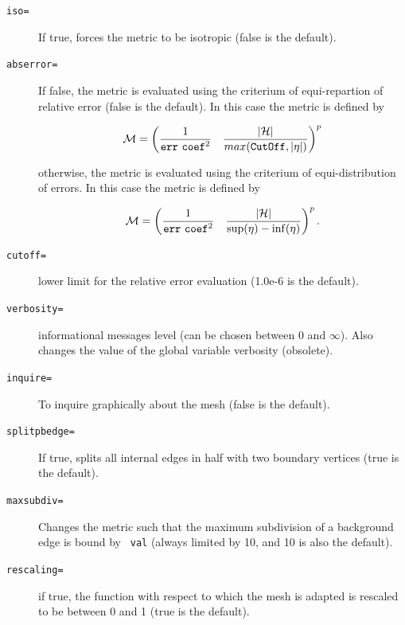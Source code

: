 \documentclass[a4paper,twoside,12pt]{book}
\begin{document}
\begin{description}
\item[\texttt{iso=}] If true, forces the metric to be isotropic (false is the default).  

\item[\texttt{abserror=}] If false, the metric is evaluated using the criterium of equi-repartion of relative error
(false is the default).  In this case the metric is defined by

\begin{equation}
  \mathcal{M} = \left({1\over\mathtt{err}\,\, \mathtt{coef}^2} \quad {
  |\mathcal{H}| \over max(\mathtt{CutOff},|\eta|)}\right)^p
  \label{eq err rel}
\end{equation}


otherwise, the metric is evaluated using the criterium of equi-distribution of errors.  In this case the metric is
defined by

\begin{equation}
  \mathcal{M} = \left({1\over \mathtt{err}\,\,\mathtt{coef}^2} \quad
  {|{\mathcal{H}|} \over
  {\sup(\eta)-\inf(\eta)}}\right)^p.\label{eq err abs}
\end{equation}

\item[\texttt{cutoff=}] lower limit for the relative error evaluation (1.0e-6 is the default).

\item[\texttt{verbosity=}] informational messages level (can be chosen between 0 and $\infty$). Also changes the value
of the global variable verbosity (obsolete).  

\item[\texttt{inquire=}] To inquire graphically about the mesh (false is the default).  

\item[\texttt{splitpbedge=}] If true, splits all internal edges in half with two boundary vertices (true is the
default).  

\item[\texttt{maxsubdiv=}] Changes the metric such that the maximum subdivision of a background edge is bound by {\tt
val} (always limited by 10, and 10 is also the default).  

\item[\texttt{rescaling=}] if true, the function with respect to which the mesh is adapted is rescaled to be between 0
and 1 (true is the default).  


\end{description}
\end{document}
